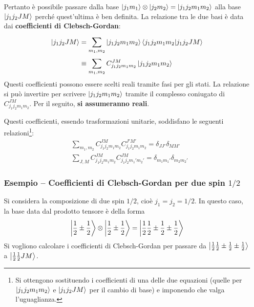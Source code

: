 \documentclass[11pt, a4paper]{scrartcl} %
\numberwithin{equation}{subsection}
\theoremstyle{style2}
\theoremstyle{style1}
\begin{document}
Pertanto \`e possibile passare dalla base $\ket{j_1m_1} \otimes \ket{j_2m_2} = \ket{j_1j_2m_1m_2} $ alla base $\ket{j_1j_2JM} $ perch\'e quest'ultima \`e ben definita.
La relazione tra le due basi \`e  data dai \textbf{coefficienti di Clebsch-Gordan}:
\begin{equation}
	\begin{split}
		\ket{j_1 j_2 J M } &= \sum_{m_1,m_2}^{} \ket{j_1j_2m_1m_2} \braket{j_1j_2m_1m_2|j_1j_2JM} \\
				   &\equiv \sum_{m_1,m_2}^{} C^{JM} _{j_1j_2m_1m_2} \ket{j_1j_2m_1m_2} 
	\end{split}
\end{equation}
Questi coefficienti possono essere scelti reali tramite fasi per gli stati. La relazione si pu\`o invertire per scrivere $\ket{j_1j_2m_1m_2} $ tramite il complesso coniugato di $C^{JM} _{j_1j_2m_1m_2} $. 
Per il seguito, \textbf{si assumeranno reali}.

Questi coefficienti, essendo trasformazioni unitarie, soddisfano le seguenti relazioni\footnote{Si ottengono sostituendo i coefficienti di una delle due equazioni (quelle per $\ket{j_1j_2m_1m_2} $ e $\ket{j_1j_2JM} $ per il cambio di base) e imponendo che valga l'uguaglianza.}:
\begin{equation}
	\begin{split}
	&\sum_{m_1,m_2}^{} C^{JM} _{j_1j_2m_1m_2} C^{J'M'} _{j_1j_2m_1m_2} = \delta _{JJ'} \delta _{MM'} \\
	&\sum_{J,M}^{} C^{JM} _{j_1j_2m_1m_2} C^{JM} _{j_1j_2m_1'm_2'} = \delta _{m_1m_1'} \delta _{m_2 m_2'}
	\end{split}
\end{equation}

\subsubsection{Esempio -- Coefficienti di Clebsch-Gordan per due spin $1/2$} 

Si considera la composizione di due spin $1 / 2$, cio\`e $j_1=j_2 = 1 / 2$.
In questo caso, la base data dal prodotto tensore \`e della forma
\[
\Ket{\frac{1}{2}\pm \frac{1}{2}} \otimes \Ket{\frac{1}{2} \pm \frac{1}{2}} = \Ket{ \frac{1}{2} \frac{1}{2}\pm \frac{1}{2} \pm \frac{1}{2}} 
\] 
Si vogliono calcolare i coefficienti di Clebsch-Gordan per passare da $\Ket{\frac{1}{2} \frac{1}{2} \pm \frac{1}{2}\pm \frac{1}{2}} $ a $\Ket{\frac{1}{2}\frac{1}{2} J M}$.
\end{document}
